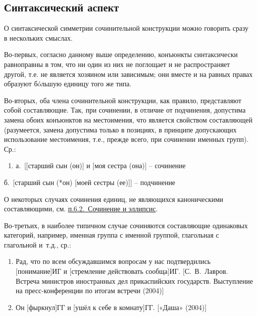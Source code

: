 \hypertarget{ux441ux438ux43dux442ux430ux43aux441ux438ux447ux435ux441ux43aux438ux439-ux430ux441ux43fux435ux43aux442}{%
\subsection{Синтаксический
аспект}\label{ux441ux438ux43dux442ux430ux43aux441ux438ux447ux435ux441ux43aux438ux439-ux430ux441ux43fux435ux43aux442}}

О синтаксической симметрии сочинительной конструкции можно говорить
сразу в нескольких смыслах.

Во-первых, согласно данному выше определению, конъюнкты синтаксически
равноправны в том, что ни один из них не поглощает и не распространяет
другой, т.е. не является хозяином или зависимым; они вместе и на равных
правах образуют бóльшую единицу того же типа.

Во-вторых, оба члена сочинительной конструкции, как правило,
представляют собой составляющие. Так, при сочинении, в отличие от
подчинения, допустима замена обоих конъюнктов на местоимения, что
является свойством составляющей (разумеется, замена допустима только в
позициях, в принципе допускающих использование местоимения, т.е., прежде
всего, при сочинении именных групп). Ср.:

\begin{enumerate}
\def\labelenumi{(\arabic{enumi})}
\setcounter{enumi}{9}
\item
  а.~{[}{[}старший сын (он){]} и {[}моя сестра (она){]} -- сочинение
\end{enumerate}

б.~{[}старший сын (*он) {[}моей сестры (ее){]}{]} -- подчинение

О некоторых случаях сочинения единиц, не являющихся каноническими
составляющими, см. \underline{п.6.2.~Сочинение и эллипсис}.

Во-третьих, в наиболее типичном случае сочиняются составляющие
одинаковых категорий, например, именная группа с именной группой,
глагольная с глагольной и~т.д., ср.:

\begin{enumerate}
\def\labelenumi{(\arabic{enumi})}
\setcounter{enumi}{10}
\item
  Рад, что по всем обсуждавшимся вопросам у нас подтвердились
  {[}понимание{]}ИГ и {[}стремление действовать сообща{]}ИГ.
  {[}С.~В.~Лавров. Встреча министров иностранных дел прикаспийских
  государств. Выступление на пресс-конференции по итогам встречи
  (2004){]}
\item
  Он {[}фыркнул{]}ГГ и {[}ушёл к себе в комнату{]}ГГ. {[}«Даша»
  (2004){]}
\end{enumerate}

